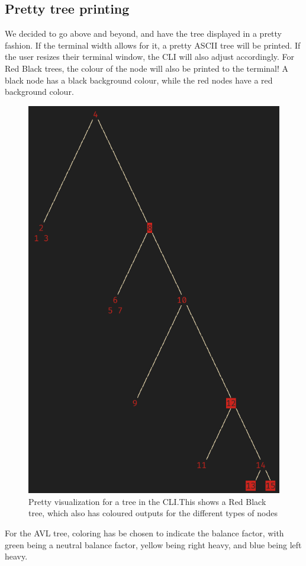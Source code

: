 \documentclass[letterpaper]{article}
\begin{document}
\subsection{Pretty tree printing}
We decided to go above and beyond, and have the tree displayed in a pretty
fashion. If the terminal width allows for it, a pretty ASCII tree will be
printed. If the user resizes their terminal window, the CLI will also adjust
accordingly.  For Red Black trees, the colour of the node will also be printed
to the terminal! A black node has a black background colour, while the red nodes
have a red background colour.
\begin{figure}[H]
      \centering
      \includegraphics[width=.8\textwidth]{rbtree.png}
      \caption{Pretty visualization for a tree in the CLI.\@ This shows a Red
      Black tree, which also has coloured outputs for the different types of
      nodes}
\end{figure}

For the AVL tree, coloring has be chosen to indicate the balance
factor, with green being a neutral balance factor, yellow being right
heavy, and blue being left heavy.
\end{document}
